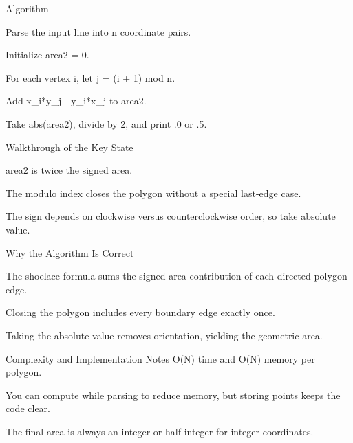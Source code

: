 \documentclass[aspectratio=169,11pt]{beamer}
\begin{document}
\begin{frame}{Algorithm}
\begin{tightitemize}
  \item Parse the input line into n coordinate pairs.
  \item Initialize area2 = 0.
  \item For each vertex i, let j = (i + 1) mod n.
  \item Add x\_i*y\_j - y\_i*x\_j to area2.
  \item Take abs(area2), divide by 2, and print .0 or .5.
\end{tightitemize}
\end{frame}

\begin{frame}{Walkthrough of the Key State}
\begin{tightitemize}
  \item area2 is twice the signed area.
  \item The modulo index closes the polygon without a special last-edge case.
  \item The sign depends on clockwise versus counterclockwise order, so take absolute value.
\end{tightitemize}
\end{frame}

\begin{frame}{Why the Algorithm Is Correct}
\begin{tightitemize}
  \item The shoelace formula sums the signed area contribution of each directed polygon edge.
  \item Closing the polygon includes every boundary edge exactly once.
  \item Taking the absolute value removes orientation, yielding the geometric area.
\end{tightitemize}
\end{frame}

\begin{frame}{Complexity and Implementation Notes}
\small
{} O(N) time and O(N) memory per polygon.

\vspace{0.3cm}
\begin{tightitemize}
  \item You can compute while parsing to reduce memory, but storing points keeps the code clear.
  \item The final area is always an integer or half-integer for integer coordinates.
\end{tightitemize}
\end{frame}
\end{document}
